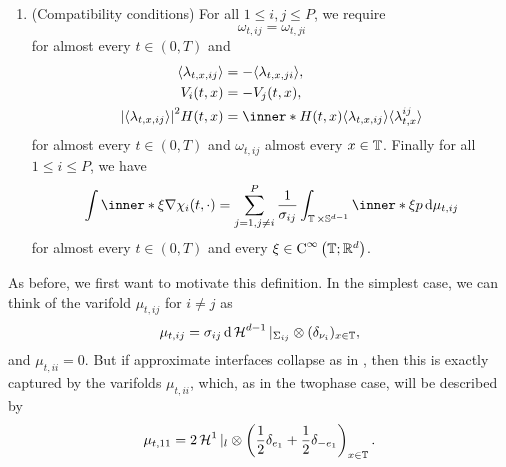 \begin{definition}
\begin{enumerate}
		\item (Compatibility conditions)
		For all $ 1 \leq i , j \leq P $, we require 
		\begin{equation}
			\label{varifold_symmetry_of_energy_measures}
			\omega_{ t , i j }
			=
			\omega_{ t , j i } 
		\end{equation}
		for almost every $ t \in ( 0 , T ) $ and
		\begin{align}
			\label{varifold_symmetry_expectations}
			\langle \lambda_{ t, x , i j } \rangle
			&= 
			- \langle \lambda_{ t, x  ,j i } \rangle,
			\\
			\label{varifold_symmetry_velocities}
			V_{ i } ( t, x ) 
			&= 
			- V_{ j } ( t, x ),
			\\
			\label{varifold_mean_curvature_points_in_normal_direction}
			\abs{ \langle \lambda_{ t , x , i j } \rangle }^{ 2 }
			H ( t, x )
			& =
			\inner*{ H( t , x ) }{ \langle \lambda_{ t , x , i j } \rangle }
			\langle \lambda_{ t , x }^{ i j } \rangle
		\end{align}
		for almost every $ t \in ( 0 , T ) $ and $ \omega_{ t , i j } $ 
		almost every $ x \in \operatorname{\mathbb{T}} $. Finally for all $ 1 \leq i \leq P $, 
		we 
		have
		\begin{equation}
			\label{varifold_compatibility_condition_multiphase}
			\int
			\inner*{ \xi }{ \nabla \chi_{ i } ( t , \cdot ) }
			=
			\sum_{ j = 1 , j \neq i }^{ P }
			\frac{ 1 }{ \sigma_{ i j } }
			\int_{ \flattorus \times \mathbb{ S }^{ d - 1 } }
			\inner*{ \xi }{ p }
			\dd{ \mu_{ t , i j } }
		\end{equation}
		for almost every $ t \in ( 0 , T ) $ and every $ \xi \in \operatorname{C}^{ 
			\infty } \left( \operatorname{\mathbb{T}} ; \mathbb{ R }^{ d } \right) $.
	\end{enumerate}
\end{definition}

As before, we first want to motivate this definition. In the simplest case, we 
can think of the varifold $ \mu_{ t , i j } $ for $ i \neq j $ as
\begin{equation}
	\label{varifold_simplest_case_mutliphase}
	\mu_{ t , i j }
	=
	\sigma_{ i j }
	\dd{ \operatorname{\mathcal{H}}^{ d - 1 }|_{ \Sigma_{ i j } } } 
	\otimes
	( \delta_{ \nu_{ i } } )_{ x \in \operatorname{\mathbb{T}} },
\end{equation}
and $ \mu_{ t , i i } = 0 $.
But if approximate interfaces collapse as in 
, then this is exactly captured by the 
varifolds $ \mu_{ t, i i }$, which, as in the 
twophase case, will be 
described by
\begin{equation}
	\label{varifold_when_interfaces_collapse}
	\mu_{ t, 1 1 }
	=
	2
	\operatorname{\mathcal{H}}^{ 1 } |_{ l }
	\otimes
	\left( 
		\frac{ 1 }{ 2 } \delta_{ e_{ 1 } } 
		+ 
		\frac{ 1 }{ 2 } \delta_{ - e_{ 1 } } 
	\right)_{ x \in \operatorname{\mathbb{T}} }.
\end{equation}

